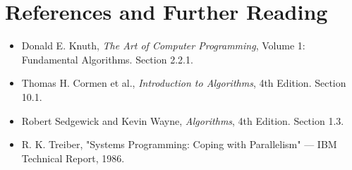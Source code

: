 \section{References and Further Reading}

\begin{itemize}
\item Donald E. Knuth, \textit{The Art of Computer Programming}, Volume 1: Fundamental Algorithms. Section 2.2.1.
\item Thomas H. Cormen et al., \textit{Introduction to Algorithms}, 4th Edition. Section 10.1.
\item Robert Sedgewick and Kevin Wayne, \textit{Algorithms}, 4th Edition. Section 1.3.
\item R. K. Treiber, "Systems Programming: Coping with Parallelism" — IBM Technical Report, 1986.
\end{itemize}

